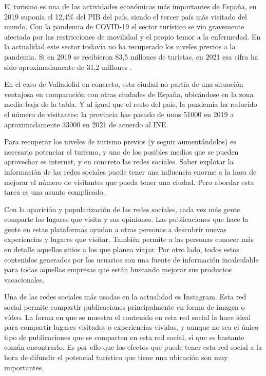 
El turismo es una de las actividades económicas más importantes de España, en 2019 suponía el 12,4\% del PIB del país, siendo el tercer país más visitado del mundo. Con la pandemia de COVID-19 el sector turístico se vio gravemente afectado por las restricciones de movilidad y el propio temor a la enfermedad. En la actualidad este sector todavía no ha recuperado los niveles previos a la pandemia. Si en 2019 se recibieron 83,5 millones de turistas, en 2021 esa cifra ha sido aproximadamente de 31,2 millones \cite{turismo_espana}.

En el caso de Valladolid en concreto, esta ciudad no partía de una situación ventajosa en comparación con otras ciudades de España, ubicándose en la zona media-baja de la tabla. Y al igual que el resto del país, la pandemia ha reducido el número de visitantes: la provincia has pasado de unos 51000 en 2019 a aproximadamente 33000 en 2021 de acuerdo al INE. 

Para recuperar los niveles de turismo previos (y seguir aumentándolos) es necesario potenciar el turismo, y uno de los posibles medios que se pueden aprovechar es internet, y en concreto las redes sociales. Saber explotar la información de las redes sociales puede tener una influencia enorme a la hora de mejorar el número de visitantes que pueda tener una ciudad. Pero abordar esta tarea es una asunto complicado.

Con la aparición y popularización de las redes sociales, cada vez más gente comparte los lugares que visita y sus opiniones. Las publicaciones que hace la gente en estas plataformas ayudan a otras personas a descubrir nuevas experiencias y lugares que visitar. También permite a las personas conocer más en detalle aquellos sitios a los que planea viajar. Por otro lado, todos estos contenidos generados por los usuarios son una fuente de información incalculable para todas aquellas empresas que están buscando mejorar sus productos vacacionales.

Una de las redes sociales más usadas en la actualidad es Instagram. Esta red social permite compartir publicaciones principalmente en forma de imagen o vídeo. La forma en que se muestra el contenido en esta red social la hace ideal para compartir lugares visitados o experiencias vividas, y aunque no sea el único tipo de publicaciones que se comparten en esta red social, si que es bastante común encontrarlo. Es por ello que los efectos que puede tener esta red social a la hora de difundir el potencial turístico que tiene una ubicación son muy importantes.

